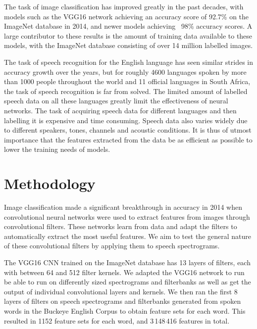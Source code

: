 The task of image classification has improved greatly in the past decades, with models such as the VGG16 network \cite{DBLP:journals/corr/SimonyanZ14a} achieving an accuracy score of 92.7\% on the ImageNet database in 2014, and newer models achieving ~98\% accuracy scores.\cite{ILSVRC15} A large contributor to these results is the amount of training data available to these models, with the ImageNet database consisting of over 14 million labelled images.

The task of speech recognition for the English language has seen similar strides in accuracy growth over the years, but for roughly 4600 languages spoken by more than 1000 people throughout the world and 11 official languages in South Africa, the task of speech recognition is far from solved.
The limited amount of labelled speech data on all these languages greatly limit the effectiveness of neural networks.
The task of acquiring speech data for different languages and then labelling it is expensive and time consuming.
Speech data also varies widely due to different speakers, tones, channels and acoustic conditions.
It is thus of utmost importance that the features extracted from the data be as efficient as possible to lower the training needs of models.

\section{Methodology}

Image classification made a significant breakthrough in accuracy in 2014 when convolutional neural networks were used to extract features from images through convolutional filters.
These networks learn from data and adapt the filters to automatically extract the most useful features.
We aim to test the general nature of these convolutional filters by applying them to speech spectrograms.

The VGG16 CNN trained on the ImageNet database has 13 layers of filters, each with between 64 and 512 filter kernels.
We adapted the VGG16 network to run be able to run on differently sized spectrograms and filterbanks as well as get the output of individual convolutional layers and kernels.
We then ran the first 8 layers of filters on speech spectrograms and filterbanks generated from spoken words in the Buckeye English Corpus to obtain feature sets for each word.
This resulted in 1152 feature sets for each word, and 3\,148\,416 features in total.

